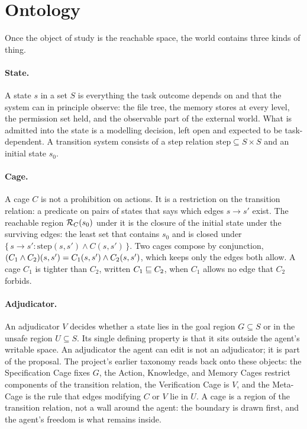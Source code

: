 \section{Ontology}
\label{sec:ontology}

Once the object of study is the reachable space, the world contains three kinds of thing.

\paragraph{State.}
A state $s$ in a set $S$ is everything the task outcome depends on and that the system can in principle observe: the file tree, the memory stores at every level, the permission set held, and the observable part of the external world. What is admitted into the state is a modelling decision, left open and expected to be task-dependent. A transition system consists of a step relation $\mathrm{step} \subseteq S \times S$ and an initial state $s_0$.

\paragraph{Cage.}
A cage $C$ is not a prohibition on actions. It is a restriction on the transition relation: a predicate on pairs of states that says which edges $s \to s'$ exist. The reachable region $\mathcal{R}_{C}(s_0)$ under it is the closure of the initial state under the surviving edges: the least set that contains $s_0$ and is closed under $\{\, s \to s' : \mathrm{step}(s,s') \wedge C(s,s') \,\}$. Two cages compose by conjunction, $(C_1 \wedge C_2)(s,s') = C_1(s,s') \wedge C_2(s,s')$, which keeps only the edges both allow. A cage $C_1$ is tighter than $C_2$, written $C_1 \sqsubseteq C_2$, when $C_1$ allows no edge that $C_2$ forbids.

\paragraph{Adjudicator.}
An adjudicator $V$ decides whether a state lies in the goal region $G \subseteq S$ or in the unsafe region $U \subseteq S$. Its single defining property is that it sits outside the agent's writable space. An adjudicator the agent can edit is not an adjudicator; it is part of the proposal. The project's earlier taxonomy reads back onto these objects: the Specification Cage fixes $G$, the Action, Knowledge, and Memory Cages restrict components of the transition relation, the Verification Cage is $V$, and the Meta-Cage is the rule that edges modifying $C$ or $V$ lie in $U$. A cage is a region of the transition relation, not a wall around the agent: the boundary is drawn first, and the agent's freedom is what remains inside.

